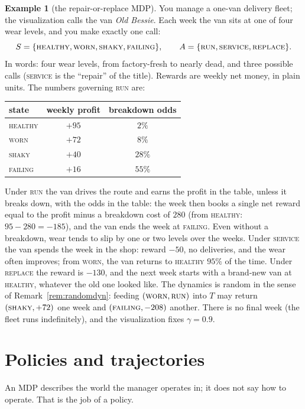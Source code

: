 \documentclass[11pt,a4paper]{article}
\theoremstyle{definition}
\newtheorem{example}[definition]{Example}
\theoremstyle{remark}
\numberwithin{equation}{section}
\newcommand{\sa}[1]{\textsc{#1}}   %
\begin{document}
\begin{example}[the repair-or-replace MDP]
You manage a one-van delivery fleet; the visualization calls the van \emph{Old Bessie}. Each
week the van sits at one of four wear levels, and you make exactly one call:
\[
S = \{\sa{healthy}, \sa{worn}, \sa{shaky}, \sa{failing}\},
\qquad
A = \{\sa{run}, \sa{service}, \sa{replace}\}.
\]
In words: four wear levels, from factory-fresh to nearly dead, and three possible calls
(\sa{service} is the ``repair'' of the title). Rewards are weekly net money, in plain
units. The numbers governing \sa{run} are:
\begin{center}
\begin{tabular}{lcc}
\toprule
state & weekly profit & breakdown odds \\
\midrule
\sa{healthy} & $+95$ & $2\%$  \\
\sa{worn}    & $+72$ & $8\%$  \\
\sa{shaky}   & $+40$ & $28\%$ \\
\sa{failing} & $+16$ & $55\%$ \\
\bottomrule
\end{tabular}
\end{center}
Under \sa{run} the van drives the route and earns the profit in the table, unless it breaks
down, with the odds in the table: the week then books a single net reward equal to the profit
minus a breakdown cost of $280$ (from \sa{healthy}: $95 - 280 = -185$), and the van ends the
week at \sa{failing}. Even without a breakdown, wear tends to slip by one or two levels over
the weeks. Under \sa{service} the van spends the week in the shop: reward $-50$, no
deliveries, and the wear often improves; from \sa{worn}, the van returns to \sa{healthy}
$95\%$ of the time. Under \sa{replace} the reward is $-130$, and the next week starts
with a brand-new van at \sa{healthy}, whatever the old one looked like. The dynamics is
random in the sense of Remark~\ref{rem:randomdyn}: feeding $(\sa{worn}, \sa{run})$ into
$T$ may return $(\sa{shaky}, +72)$ one week and $(\sa{failing}, -208)$ another. There
is no final week (the fleet runs indefinitely), and the visualization fixes $\gamma = 0.9$.
\end{example}

\section{Policies and trajectories}

An MDP describes the world the manager operates in; it does not say how to operate. That is
the job of a policy.
\end{document}
